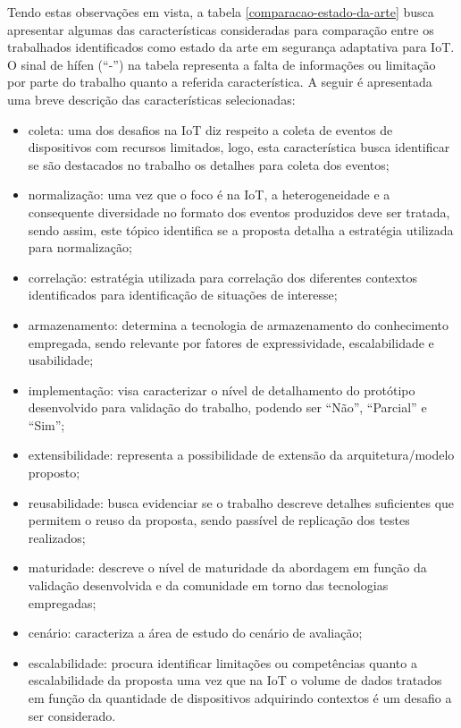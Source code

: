 \documentclass[tid,table]{texufpel} %
\begin{document}
Tendo estas observações em vista, a tabela \ref{comparacao-estado-da-arte} busca apresentar algumas das características consideradas para comparação entre os trabalhados identificados como estado da arte em segurança adaptativa para IoT. O sinal de hífen (``-'') na tabela representa a falta de informações ou limitação por parte do trabalho quanto a referida característica. A seguir é apresentada uma breve descrição das características selecionadas:

\begin{itemize}
\item coleta: uma dos desafios na IoT diz respeito a coleta de eventos de dispositivos com recursos limitados, logo, esta característica busca identificar se são destacados no trabalho os detalhes para coleta dos eventos;
\item normalização: uma vez que o foco é na IoT, a heterogeneidade e a consequente diversidade no formato dos eventos produzidos deve ser tratada, sendo assim, este tópico identifica se a proposta detalha a estratégia utilizada para normalização;
\item correlação: estratégia utilizada para correlação dos diferentes contextos identificados para identificação de situações de interesse;
\item armazenamento: determina a tecnologia de armazenamento do conhecimento empregada, sendo relevante por fatores de expressividade, escalabilidade e usabilidade;
\item implementação: visa caracterizar o nível de detalhamento do protótipo desenvolvido para validação do trabalho, podendo ser 
``Não'', ``Parcial'' e ``Sim'';
\item extensibilidade: representa a possibilidade de extensão da arquitetura/modelo proposto;
\item reusabilidade: busca evidenciar se o trabalho descreve detalhes suficientes que permitem o reuso da proposta, sendo passível de replicação dos testes realizados;
\item maturidade: descreve o nível de maturidade da abordagem em função da validação desenvolvida e da comunidade em torno das tecnologias empregadas;
\item cenário: caracteriza a área de estudo do cenário de avaliação;
\item escalabilidade: procura identificar limitações ou competências quanto a escalabilidade da proposta uma vez que na IoT o volume de dados tratados em função da quantidade de dispositivos adquirindo contextos é um desafio a ser considerado.
\end{itemize}
\end{document}
